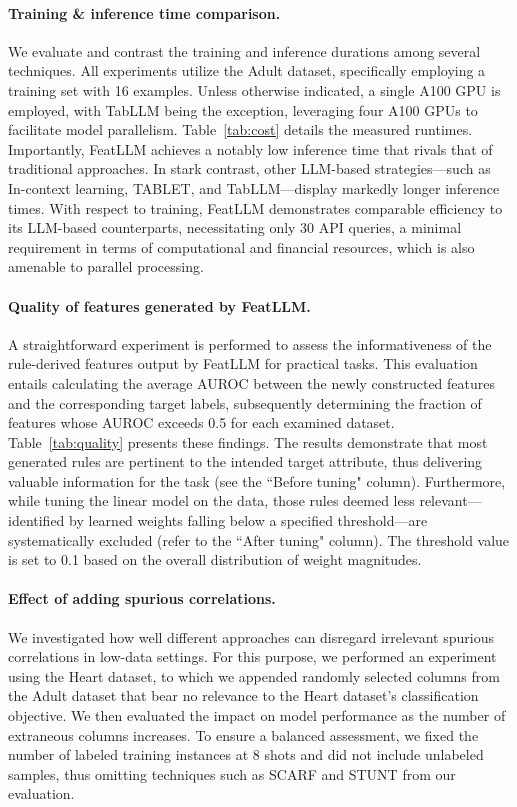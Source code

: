 \vspace*{-0.12in}
\paragraph{Training \& inference time comparison.} We evaluate and contrast the training and inference durations among several techniques. All experiments utilize the Adult dataset, specifically employing a training set with 16 examples. Unless otherwise indicated, a single A100 GPU is employed, with TabLLM being the exception, leveraging four A100 GPUs to facilitate model parallelism. Table~\ref{tab:cost} details the measured runtimes. Importantly, \textsf{FeatLLM} achieves a notably low inference time that rivals that of traditional approaches. In stark contrast, other LLM-based strategies—such as In-context learning, TABLET, and TabLLM—display markedly longer inference times. With respect to training, \textsf{FeatLLM} demonstrates comparable efficiency to its LLM-based counterparts, necessitating only 30 API queries, a minimal requirement in terms of computational and financial resources, which is also amenable to parallel processing.

\vspace*{-0.12in}
\paragraph{Quality of features generated by \textsf{FeatLLM}.}
A straightforward experiment is performed to assess the informativeness of the rule-derived features output by \textsf{FeatLLM} for practical tasks. This evaluation entails calculating the average AUROC between the newly constructed features and the corresponding target labels, subsequently determining the fraction of features whose AUROC exceeds 0.5 for each examined dataset. Table~\ref{tab:quality} presents these findings. The results demonstrate that most generated rules are pertinent to the intended target attribute, thus delivering valuable information for the task (see the ``Before tuning" column). Furthermore, while tuning the linear model on the data, those rules deemed less relevant—identified by learned weights falling below a specified threshold—are systematically excluded (refer to the ``After tuning" column). The threshold value is set to 0.1 based on the overall distribution of weight magnitudes.

\vspace*{-0.12in}
\paragraph{Effect of adding spurious correlations.} We investigated how well different approaches can disregard irrelevant spurious correlations in low-data settings. For this purpose, we performed an experiment using the Heart dataset, to which we appended randomly selected columns from the Adult dataset that bear no relevance to the Heart dataset's classification objective. We then evaluated the impact on model performance as the number of extraneous columns increases. To ensure a balanced assessment, we fixed the number of labeled training instances at 8 shots and did not include unlabeled samples, thus omitting techniques such as SCARF and STUNT from our evaluation.

